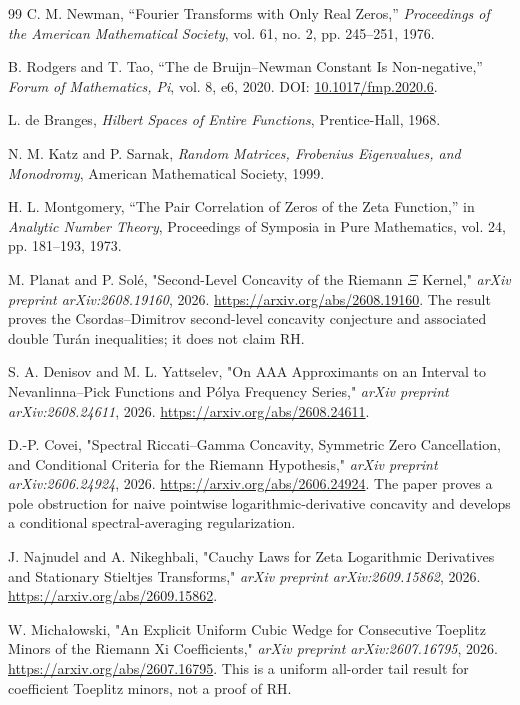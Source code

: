 \begin{thebibliography}{99}
C. M. Newman,
``Fourier Transforms with Only Real Zeros,''
\emph{Proceedings of the American Mathematical Society}, vol. 61, no. 2, pp. 245--251, 1976.

B. Rodgers and T. Tao,
``The de Bruijn--Newman Constant Is Non-negative,''
\emph{Forum of Mathematics, Pi}, vol. 8, e6, 2020.
DOI: \href{https://doi.org/10.1017/fmp.2020.6}{10.1017/fmp.2020.6}.

L. de Branges,
\emph{Hilbert Spaces of Entire Functions},
Prentice-Hall, 1968.

N. M. Katz and P. Sarnak,
\emph{Random Matrices, Frobenius Eigenvalues, and Monodromy},
American Mathematical Society, 1999.

H. L. Montgomery,
``The Pair Correlation of Zeros of the Zeta Function,''
in \emph{Analytic Number Theory}, Proceedings of Symposia in Pure Mathematics, vol. 24, pp. 181--193, 1973.


M. Planat and P. Sol{\'e},
"Second-Level Concavity of the Riemann $\Xi$ Kernel,"
\emph{arXiv preprint arXiv:2608.19160}, 2026.
\url{https://arxiv.org/abs/2608.19160}.
The result proves the Csordas--Dimitrov second-level concavity conjecture and associated double Tur{\'a}n inequalities; it does not claim RH.

S. A. Denisov and M. L. Yattselev,
"On AAA Approximants on an Interval to Nevanlinna--Pick Functions and P{\'o}lya Frequency Series,"
\emph{arXiv preprint arXiv:2608.24611}, 2026.
\url{https://arxiv.org/abs/2608.24611}.

D.-P. Covei,
"Spectral Riccati--Gamma Concavity, Symmetric Zero Cancellation, and Conditional Criteria for the Riemann Hypothesis,"
\emph{arXiv preprint arXiv:2606.24924}, 2026.
\url{https://arxiv.org/abs/2606.24924}.
The paper proves a pole obstruction for naive pointwise logarithmic-derivative concavity and develops a conditional spectral-averaging regularization.

J. Najnudel and A. Nikeghbali,
"Cauchy Laws for Zeta Logarithmic Derivatives and Stationary Stieltjes Transforms,"
\emph{arXiv preprint arXiv:2609.15862}, 2026.
\url{https://arxiv.org/abs/2609.15862}.

W. Micha{\l}owski,
"An Explicit Uniform Cubic Wedge for Consecutive Toeplitz Minors of the Riemann Xi Coefficients,"
\emph{arXiv preprint arXiv:2607.16795}, 2026.
\url{https://arxiv.org/abs/2607.16795}.
This is a uniform all-order tail result for coefficient Toeplitz minors, not a proof of RH.


\end{thebibliography}
